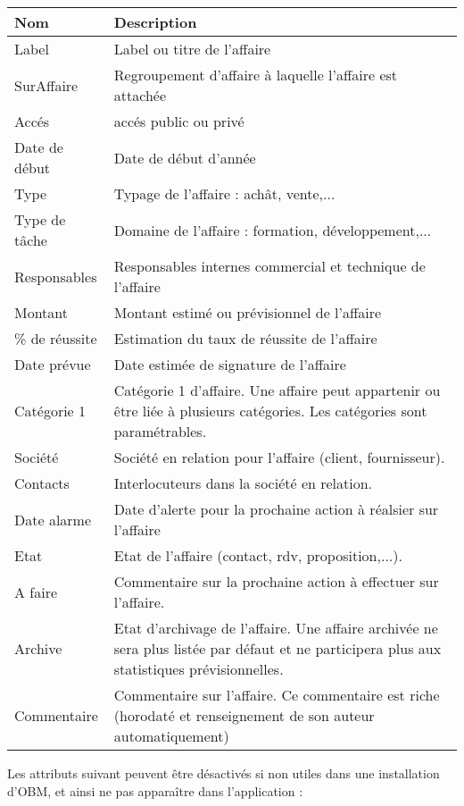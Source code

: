 \begin{tabular}{|p{3cm}|p{10cm}|}
\hline
\textbf{Nom} & \textbf{Description} \\
\hline
Label & Label ou titre de l'affaire \\
\hline
SurAffaire & Regroupement d'affaire à laquelle l'affaire est attachée \\
\hline
Accés & accés public ou privé \\
\hline
Date de début & Date de début d'année \\
\hline
Type & Typage de l'affaire : achât, vente,... \\
\hline
Type de tâche & Domaine de l'affaire : formation, développement,... \\
\hline
Responsables & Responsables internes commercial et technique de l'affaire \\
\hline
Montant & Montant estimé ou prévisionnel de l'affaire \\
\hline
\% de réussite & Estimation du taux de réussite de l'affaire \\
\hline
Date prévue & Date estimée de signature de l'affaire \\
\hline
Catégorie 1 & Catégorie 1 d'affaire. Une affaire peut appartenir ou être liée à plusieurs catégories. Les catégories sont paramétrables.\\
\hline
Société & Société en relation pour l'affaire (client, fournisseur).\\
\hline
Contacts & Interlocuteurs dans la société en relation.\\
\hline
Date alarme & Date d'alerte pour la prochaine action à réalsier sur l'affaire \\
\hline
Etat & Etat de l'affaire (contact, rdv, proposition,...).\\
\hline
A faire & Commentaire sur la prochaine action à effectuer sur l'affaire.\\
\hline
Archive & Etat d'archivage de l'affaire. Une affaire archivée ne sera plus listée par défaut et ne participera plus aux statistiques prévisionnelles.\\
\hline
Commentaire & Commentaire sur l'affaire. Ce commentaire est riche (horodaté et renseignement de son auteur automatiquement)\\
\hline
\end{tabular}
\vspace{0.3cm}

Les attributs suivant peuvent être désactivés si non utiles dans une installation d'OBM, et ainsi ne pas apparaître dans l'application :

